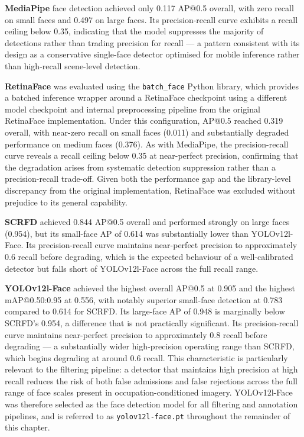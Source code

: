 \textbf{MediaPipe} \cite{Lugaresi_2019_MediaPipe} face detection achieved 
only 0.117 AP@0.5 overall, with zero recall on small faces and 0.497 on 
large faces. Its precision-recall curve exhibits a recall ceiling below 
0.35, indicating that the model suppresses the majority of detections 
rather than trading precision for recall — a pattern consistent with its 
design as a conservative single-face detector optimised for mobile 
inference rather than high-recall scene-level detection.

\textbf{RetinaFace} \cite{Deng_2020_RetinaFace} was evaluated using the 
\texttt{batch\_face} Python library, which provides a batched inference 
wrapper around a RetinaFace checkpoint using a different model checkpoint 
and internal preprocessing pipeline from the original RetinaFace 
implementation. Under this configuration, AP@0.5 reached 0.319 overall, 
with near-zero recall on small faces (0.011) and substantially degraded 
performance on medium faces (0.376). As with MediaPipe, the 
precision-recall curve reveals a recall ceiling below 0.35 at near-perfect 
precision, confirming that the degradation arises from systematic detection 
suppression rather than a precision-recall trade-off. Given both the 
performance gap and the library-level discrepancy from the original 
implementation, RetinaFace was excluded without prejudice to its general 
capability.

\textbf{SCRFD} \cite{Guo_2021_SCRFD} achieved 0.844 AP@0.5 overall and 
performed strongly on large faces (0.954), but its small-face AP of 0.614 
was substantially lower than YOLOv12l-Face. Its precision-recall curve 
maintains near-perfect precision to approximately 0.6 recall before 
degrading, which is the expected behaviour of a well-calibrated detector 
but falls short of YOLOv12l-Face across the full recall range.

\textbf{YOLOv12l-Face} \cite{Jocher_2023_YOLOv8} achieved the highest 
overall AP@0.5 at 0.905 and the highest mAP@0.50:0.95 at 0.556, with 
notably superior small-face detection at 0.783 compared to 0.614 for 
SCRFD. Its large-face AP of 0.948 is marginally below SCRFD's 0.954, a 
difference that is not practically significant. Its precision-recall curve 
maintains near-perfect precision to approximately 0.8 recall before 
degrading — a substantially wider high-precision operating range than SCRFD, 
which begins degrading at around 0.6 recall. This characteristic is 
particularly relevant to the filtering pipeline: a detector that maintains 
high precision at high recall reduces the risk of both false admissions and 
false rejections across the full range of face scales present in 
occupation-conditioned imagery. YOLOv12l-Face was therefore selected as 
the face detection model for all filtering and annotation pipelines, and 
is referred to as \texttt{yolov12l-face.pt} throughout the remainder of 
this chapter.

